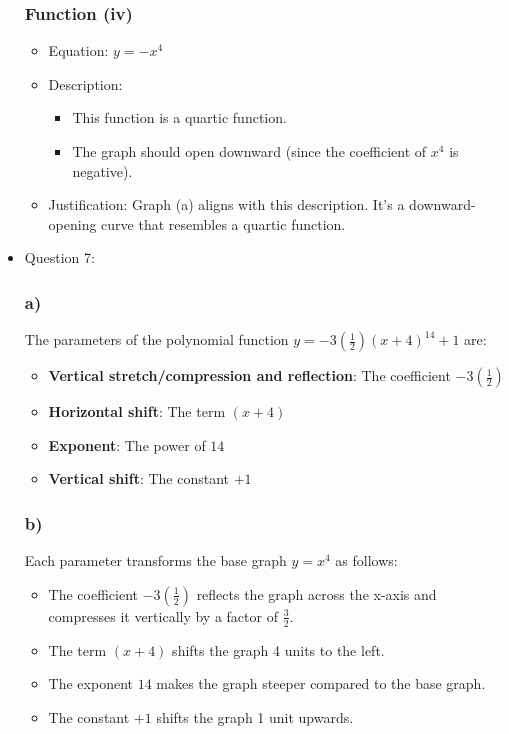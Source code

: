 \documentclass{article}
\begin{document}
\begin{itemize}
\subsubsection*{Function (iv)}
\begin{itemize}
    \item Equation: \(y = -x^4\)
    \item Description:
    \begin{itemize}
        \item This function is a quartic function.
        \item The graph should open downward (since the coefficient of \(x^4\) is negative).
    \end{itemize}
    \item Justification: Graph (a) aligns with this description. It's a downward-opening curve that resembles a quartic function.
\end{itemize}
\item Question 7:
\subsubsection*{a)}
The parameters of the polynomial function \( y = -3\left(\frac{1}{2}\right)(x + 4)^{14} + 1 \) are:
\begin{itemize}
    \item \textbf{Vertical stretch/compression and reflection}: The coefficient \(-3\left(\frac{1}{2}\right)\)
    \item \textbf{Horizontal shift}: The term \((x + 4)\)
    \item \textbf{Exponent}: The power of \(14\)
    \item \textbf{Vertical shift}: The constant \(+1\)
\end{itemize}

\subsubsection*{b)}
Each parameter transforms the base graph \( y = x^4 \) as follows:
\begin{itemize}
    \item The coefficient \(-3\left(\frac{1}{2}\right)\) reflects the graph across the x-axis and compresses it vertically by a factor of \(\frac{3}{2}\).
    \item The term \((x + 4)\) shifts the graph 4 units to the left.
    \item The exponent \(14\) makes the graph steeper compared to the base graph.
    \item The constant \(+1\) shifts the graph 1 unit upwards.
\end{itemize}


\end{itemize}
\end{document}
